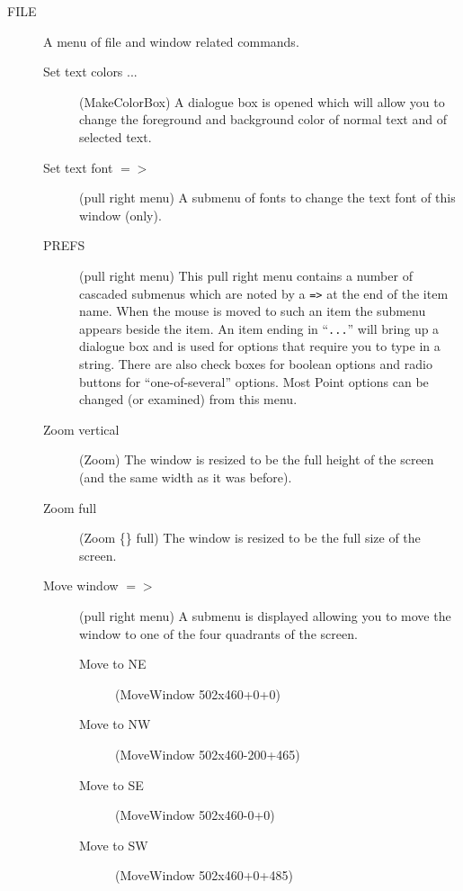 \begin{description}

\item[FILE] A menu of file and window related commands.
	\begin{description}

	\item[Set text colors ...] (MakeColorBox)
	A dialogue box is opened which will allow you to
	change the foreground and background color of normal
	text and of selected text.

	\item[Set text font $=>$] (pull right menu)
	A submenu of fonts to change the text font of this window
	(only).

	\item[PREFS] (pull right menu)
	This pull right menu contains a number of cascaded submenus which are
	noted by a {\tt =>} at the end of the item name.
	When the mouse is moved to such an item the submenu appears beside
	the item.
	An item ending in ``{\tt ...}'' will bring up a dialogue box
	and is used for options that require you to type in a string.
	There are also check boxes for boolean options and radio buttons
	for ``one-of-several'' options.
	Most Point options can be changed (or examined) from this menu.

	\item[Zoom vertical] (Zoom)
	The window is resized to be the full height
	of the screen (and the same width as it was before).

	\item[Zoom full] (Zoom \{\} full)
	The window is resized to be the full size of the screen.

	\item[Move window $=>$] (pull right menu)
	A submenu is displayed allowing you to move
	the window to one of the four quadrants of
	the screen.
	\begin{description}

		\item[Move to NE] (MoveWindow 502x460+0+0)

		\item[Move to NW] (MoveWindow 502x460-200+465)

		\item[Move to SE] (MoveWindow 502x460-0+0)

		\item[Move to SW] (MoveWindow 502x460+0+485)

	\end{description}


\end{description}
\end{description}
